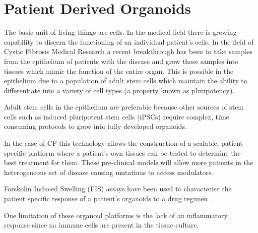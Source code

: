 \section{Patient Derived Organoids}
The basic unit of living things are cells. In the medical field there is growing capability to discern the functioning of an individual patient's cells. In the field of Cystic Fibrosis Medical Research a recent breakthrough has been to take samples from the epithelium of patients with the disease and grow those samples into tissues which mimic the function of the entire organ\cite{depoel2020}. This is possible in the epithelium due to a population of adult stem cells which maintain the ability to differentiate into a variety of cell types (a property known as pluripotency). 

Adult stem cells in the epithelium are preferable because other sources of stem cells such as induced pluripotent stem cells (iPSCs) require complex, time consuming protocols to grow into fully developed organoids. 

In the case of CF this technology allows the construction of a scalable, patient specific platform where a patient's own tissues can be tested to determine the best treatment for them. These pre-clinical models will allow more patients in the heterogeneous set of disease causing mutations to access modulators. 

Forskolin Induced Swelling (FIS) assays have been used to characterise the patient specific response of a patient's organoids to a drug regimen \cite{dekkers2013}. 


One limitation of these organoid platforms is the lack of an inflammatory response since no immune cells are present in the tissue culture. 


%

